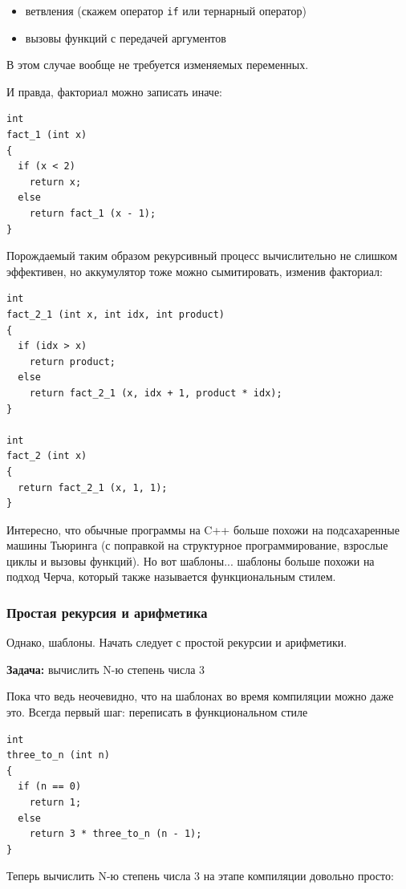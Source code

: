 \documentclass[a4paper,12pt,oneside]{article}
\begin{document}
\begin{itemize}
\item ветвления (скажем оператор \lstinline!if! или тернарный оператор)
\item вызовы функций с передачей аргументов
\end{itemize}

В этом случае вообще не требуется изменяемых переменных.

И правда, факториал можно записать иначе:

\begin{lstlisting}
int
fact_1 (int x)
{
  if (x < 2)
    return x;
  else
    return fact_1 (x - 1);
}
\end{lstlisting}

Порождаемый таким образом рекурсивный процесс вычислительно не слишком эффективен, но аккумулятор тоже можно сымитировать, изменив факториал:

\begin{lstlisting}
int
fact_2_1 (int x, int idx, int product)
{
  if (idx > x)
    return product;
  else
    return fact_2_1 (x, idx + 1, product * idx);
}

int
fact_2 (int x)
{
  return fact_2_1 (x, 1, 1);
}

\end{lstlisting}

Интересно, что обычные программы на C++ больше похожи на подсахаренные машины Тьюринга (с поправкой на структурное программирование, взрослые циклы и вызовы функций). Но вот шаблоны... шаблоны больше похожи на подход Черча, который также называется функциональным стилем.

\subsubsection{Простая рекурсия и арифметика}\label{SimpleRecursion}

Однако, шаблоны. Начать следует с простой рекурсии и арифметики. 

\textbf{Задача:} вычислить N-ю степень числа 3

Пока что ведь неочевидно, что на шаблонах во время компиляции можно даже это. Всегда первый шаг: переписать в функциональном стиле

\begin{lstlisting}
int
three_to_n (int n)
{
  if (n == 0)
    return 1;
  else
    return 3 * three_to_n (n - 1);
}
\end{lstlisting}

Теперь вычислить N-ю степень числа 3 на этапе компиляции довольно просто:
\end{document}
